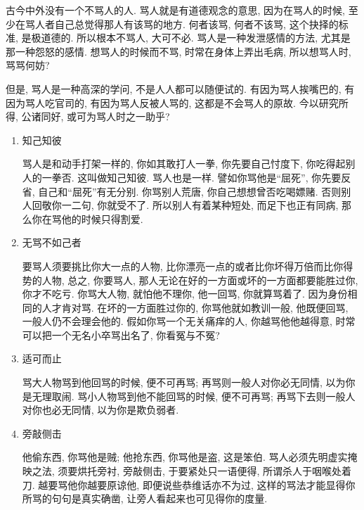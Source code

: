 
\hspace{1.8em}古今中外没有一个不骂人的人. 骂人就是有道德观念的意思, 因为在骂人的时候, 至少在骂人者自己总觉得那人有该骂的地方. 何者该骂, 何者不该骂, 这个抉择的标准, 是极道德的. 所以根本不骂人, 大可不必. 骂人是一种发泄感情的方法, 尤其是那一种怨怒的感情. 想骂人的时候而不骂, 时常在身体上弄出毛病, 所以想骂人时, 骂骂何妨? 

\hspace{1.8em}但是, 骂人是一种高深的学问, 不是人人都可以随便试的. 有因为骂人挨嘴巴的, 有因为骂人吃官司的, 有因为骂人反被人骂的, 这都是不会骂人的原故. 今以研究所得, 公诸同好, 或可为骂人时之一助乎? 

\begin{enumerate}

\item 知己知彼

\hspace{1.8em}骂人是和动手打架一样的, 你如其敢打人一拳, 你先要自己忖度下, 你吃得起别人的一拳否. 这叫做知己知彼. 骂人也是一样. 譬如你骂他是“屈死”, 你先要反省, 自己和“屈死”有无分别. 你骂别人荒唐, 你自己想想曾否吃喝嫖赌. 否则别人回敬你一二句, 你就受不了. 所以别人有着某种短处, 而足下也正有同病, 那么你在骂他的时候只得割爱. 

\item 无骂不如己者

\hspace{1.8em}要骂人须要挑比你大一点的人物, 比你漂亮一点的或者比你坏得万倍而比你得势的人物, 总之, 你要骂人, 那人无论在好的一方面或坏的一方面都要能胜过你, 你才不吃亏. 你骂大人物, 就怕他不理你, 他一回骂, 你就算骂着了. 因为身份相同的人才肯对骂. 在坏的一方面胜过你的, 你骂他就如教训一般, 他既便回骂, 一般人仍不会理会他的. 假如你骂一个无关痛痒的人, 你越骂他他越得意, 时常可以把一个无名小卒骂出名了, 你看冤与不冤? 

\item 适可而止

\hspace{1.8em}骂大人物骂到他回骂的时候, 便不可再骂; 再骂则一般人对你必无同情, 以为你是无理取闹. 骂小人物骂到他不能回骂的时候, 便不可再骂; 再骂下去则一般人对你也必无同情, 以为你是欺负弱者. 

\item 旁敲侧击

\hspace{1.8em}他偷东西, 你骂他是贼; 他抢东西, 你骂他是盗, 这是笨伯. 骂人必须先明虚实掩映之法, 须要烘托旁衬, 旁敲侧击, 于要紧处只一语便得, 所谓杀人于咽喉处着刀. 越要骂他你越要原谅他, 即便说些恭维话亦不为过, 这样的骂法才能显得你所骂的句句是真实确凿, 让旁人看起来也可见得你的度量. 


\end{enumerate}
